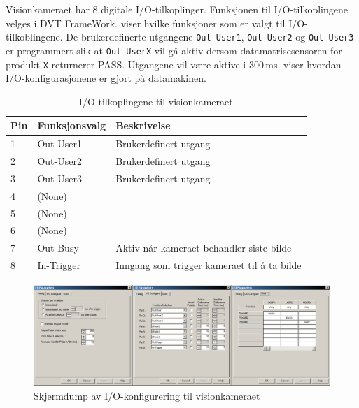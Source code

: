 \documentclass[Visionprosjekt.tex]{subfiles}
\begin{document}
Visionkameraet har 8 digitale I/O-tilkoplinger. Funksjonen til I/O-tilkoplingene velges i DVT FrameWork.  viser hvilke funksjoner som er valgt til I/O-tilkoblingene. De brukerdefinerte utgangene \texttt{Out-User1}, \texttt{Out-User2} og \texttt{Out-User3} er programmert slik at \texttt{Out-UserX} vil gå aktiv dersom datamatrisesensoren for produkt \texttt{X} returnerer  PASS. Utgangene vil være aktive i 300\,ms.  viser hvordan I/O-konfigurasjonene er gjort på datamakinen.


\begin{table}[ht]
    \centering
    \caption{I/O-tilkoplingene til visionkameraet}
    \label{tab:visionio}
    \begin{tabular}{l>{\ttfamily}ll}
        \toprule
        Pin &	\normalfont Funksjonsvalg &		Beskrivelse\\
        \midrule
		1 &		Out-User1 &		Brukerdefinert utgang\\
		2 &		Out-User2 &		Brukerdefinert utgang\\
		3 &		Out-User3 &		Brukerdefinert utgang\\
		4 &		(None) &		\\
		5 &		(None) &		\\
		6 &		(None) &		\\
		7 &		Out-Busy &		Aktiv når kameraet behandler siste bilde\\
		8 &		In-Trigger &	Inngang som trigger kameraet til å ta bilde\\
        \bottomrule
    \end{tabular}
\end{table}

\begin{figure}[ht]
	\centering
		\includegraphics[width=\textwidth]{bilder/iokonfig.png}
	\caption{Skjermdump av I/O-konfigurering til visionkameraet}
    \label{fig:iokonfig}
\end{figure}
\end{document}

